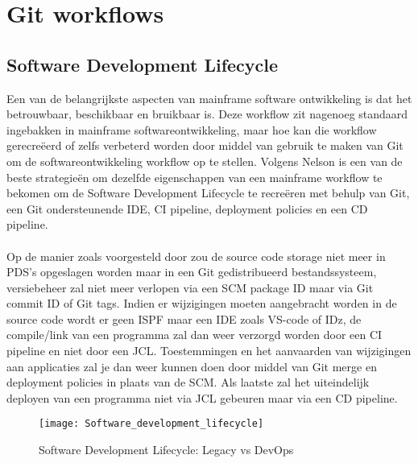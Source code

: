 \section{Git workflows}
\subsection{Software Development Lifecycle}
Een van de belangrijkste aspecten van mainframe software ontwikkeling is dat het betrouwbaar, beschikbaar en bruikbaar is. Deze workflow zit nagenoeg standaard ingebakken in mainframe softwareontwikkeling, maar hoe kan die workflow gerecreëerd of zelfs verbeterd worden door middel van gebruik te maken van Git om de softwareontwikkeling workflow op te stellen. Volgens Nelson \textcite{Lopez2023} is een van de beste strategieën om dezelfde eigenschappen van een mainframe workflow te bekomen om de Software Development Lifecycle te recreëren met behulp van Git, een Git ondersteunende IDE, CI pipeline, deployment policies en een CD pipeline.
\\ \\
Op de manier zoals voorgesteld door \textcite{Lopez2023} zou de source code storage niet meer in PDS's opgeslagen worden maar in een Git gedistribueerd bestandssysteem, versiebeheer zal niet meer verlopen via een SCM package ID maar via Git commit ID of Git tags. Indien er wijzigingen moeten aangebracht worden in de source code wordt er geen ISPF maar een IDE zoals VS-code of IDz, de compile/link van een programma zal dan weer verzorgd worden door een CI pipeline en niet door een JCL. Toestemmingen en het aanvaarden van wijzigingen aan applicaties zal je dan weer kunnen doen door middel van Git merge en deployment policies in plaats van de SCM. Als laatste zal het uiteindelijk deployen van een programma niet via JCL gebeuren maar via een CD pipeline.
\begin{figure}[h]
    \centering
    \texttt{[image: Software\_development\_lifecycle]}
    \caption{Software Development Lifecycle: Legacy vs DevOps \autocite{Lopez2023}}
    \label{fig:software development lifecycle}
\end{figure}
\\ \\ \\ \\
